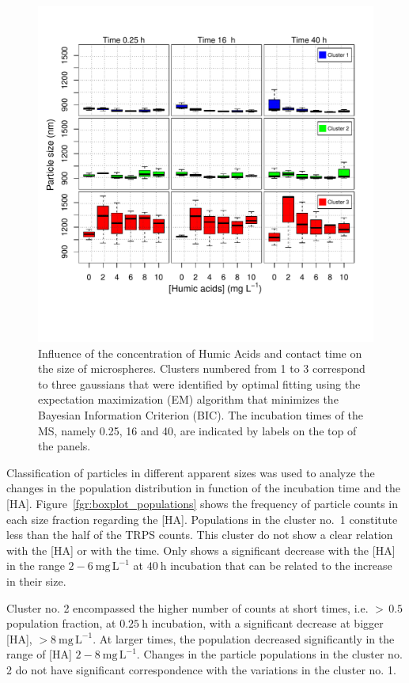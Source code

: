 \documentclass[journal=langd5,manuscript=article]{achemso}
\begin{document}
 \begin{figure}
  \includegraphics[width=0.8\linewidth]{Figures/Boxplot_MS_HA_CaCl2_sizes_rev.pdf}
  \caption{Influence of the concentration of Humic Acids and contact time on the  size of microspheres.  Clusters numbered from 1 to 3 correspond to three gaussians that were identified by optimal fitting using the expectation maximization (EM) algorithm  that minimizes the Bayesian Information Criterion (BIC). The incubation times of the MS,  namely 0.25, 16 and 40, are indicated by labels on the top of the panels.}
  \label{fgr:boxplot_size}
\end{figure}


Classification of particles in different apparent sizes was used to analyze the changes in the population distribution in function of the incubation time and the [HA]. Figure~\ref{fgr:boxplot_populations} shows the frequency of particle counts in each size fraction regarding the [HA]. %
Populations in the cluster no.~1 constitute less than the half of the TRPS counts. This cluster do not show a clear relation with the [HA] or with the time. Only  shows a  significant decrease with the [HA] in the range $2-6~\mathrm{mg\,L^{-1}}$ at $40~\mathrm{h}$ incubation that can be related to the increase in their size.

Cluster no. 2 encompassed the higher number of counts at short times, i.e. $>\,0.5$ population fraction, at $0.25~\mathrm{h}$ incubation, with a significant decrease at bigger [HA], $>8~\mathrm{mg\,L^{-1}}$. At larger times, the population decreased significantly in the range of [HA] $2-8~\mathrm{mg\,L^{-1}}$. Changes in the particle populations in the cluster no. 2 do not have significant correspondence  with the variations in the cluster no. 1.%
\end{document}
